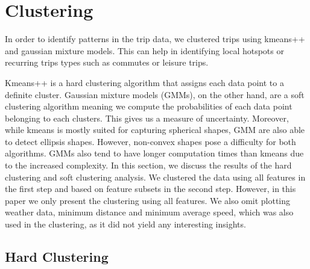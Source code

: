 \section{Clustering}
\label{sec:clustering}

In order to identify patterns in the trip data, we clustered trips using kmeans++ and gaussian mixture models. This can help in identifying local hotspots or recurring trips types such as commutes or leisure trips. 

Kmeans++ is a hard clustering algorithm that assigns each data point to a definite cluster. Gaussian mixture models (GMMs), on the other  hand, are a soft clustering algorithm meaning we compute the probabilities of each data point belonging to each clusters. This gives us a measure of uncertainty. Moreover, while kmeans is mostly suited for capturing spherical shapes, GMM are also able to detect ellipsis shapes. However, non-convex shapes pose a difficulty for both algorithms. GMMs also tend to have longer computation times than kmeans due to the increased complexity. 
In this section, we discuss the results of the hard clustering and soft clustering analysis. We clustered the data using all features in the first step and based on feature subsets in the second step. However, in this paper we only present the clustering using all features. We also omit plotting weather data, minimum distance and minimum average speed, which was also used in the clustering, as it did not yield any interesting insights. 

\subsection{Hard Clustering}
\label{sec:hard_clustering}


